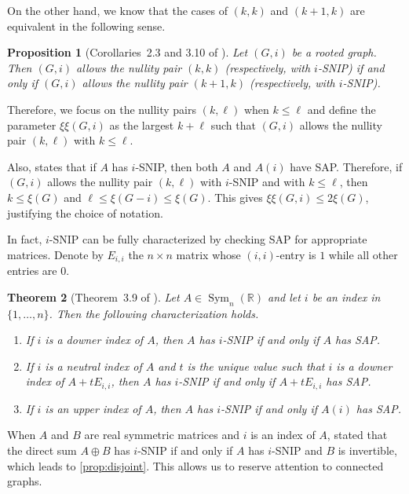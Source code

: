 \documentclass{article}
\newtheorem{theorem}{Theorem}[section]
\newtheorem{proposition}[theorem]{Proposition}
\theoremstyle{definition}
\newcommand{\excise}{\xi\xi}
\newcommand{\msym}[1][n]{\operatorname{Sym}_{#1}(\mathbb{R})}
\begin{document}
On the other hand, we know that the cases of $(k,k)$ and $(k+1,k)$ are equivalent in the following sense.  

\begin{proposition}[Corollaries~2.3 and 3.10 of \cite{SNIP}]
\label{prop:kk1}
Let $(G,i)$ be a rooted graph.  Then $(G,i)$ allows the nullity pair  $(k,k)$ (respectively, with $i$-SNIP) if and only if $(G,i)$ allows the nullity pair $(k+1, k)$ (respectively, with $i$-SNIP).
\end{proposition}

Therefore, we focus on the nullity pairs $(k,\ell)$ when $k \leq \ell$ and define the parameter $\excise(G,i)$ as the largest $k + \ell$ such that $(G,i)$ allows the nullity pair $(k,\ell)$ with $k \leq \ell$.  

Also, \cite[Lemma~3.6]{SNIP} states that if $A$ has $i$-SNIP, then both $A$ and $A(i)$ have SAP.  Therefore, if $(G,i)$ allows the nullity pair $(k,\ell)$ with $i$-SNIP and with $k\leq \ell$, then $k \leq \xi(G)$ and $\ell \leq \xi(G - i) \leq \xi(G)$.
This gives $\excise(G,i) \leq 2\xi(G)$, justifying the choice of notation.

In fact, $i$-SNIP can be fully characterized by checking SAP for appropriate matrices.
Denote by $E_{i,i}$ the $n \times n$ matrix whose $(i,i)$-entry is $1$ while all other entries are $0$.

\begin{theorem}[Theorem~3.9 of \cite{SNIP}]
\label{thm:snipchar}
Let $A\in\msym$ and let $i$ be an index in $\{1,\dots,n\}$.  Then the following characterization holds.
\begin{enumerate}[label={{\rm(\alph*)}}]
\item If  $i$ is a downer index of $A$, then $A$ has $i$-SNIP if and only if $A$ has SAP.
\item If $i$ is a neutral index of $A$ and $t$ is the unique value such that $i$ is a downer index of $A + tE_{i,i}$, then  $A$ has $i$-SNIP if and only if $A + tE_{i,i}$ has SAP.
 \item If $i$ is an upper index of $A$, then $A$ has $i$-SNIP if and only if $A(i)$ has SAP.
\end{enumerate}
\end{theorem}

When $A$ and $B$ are real symmetric matrices and $i$ is an index of $A$, \cite[Proposition~3.5]{SNIP} stated that the direct sum $A\oplus B$ has $i$-SNIP if and only if $A$ has $i$-SNIP and $B$ is invertible, which leads to \cref{prop:disjoint}.  This allows us to reserve attention to connected graphs.
\end{document}
